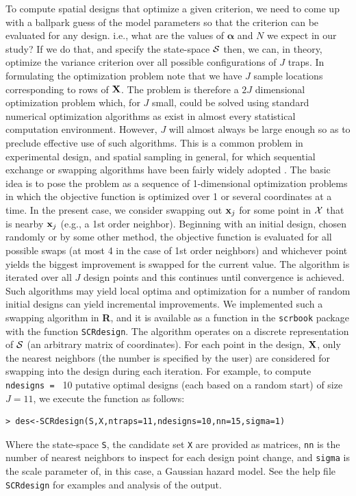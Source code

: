 To compute spatial designs that optimize a given criterion, we need to
come up with a ballpark guess of the model parameters so that the
criterion can be evaluated for any design. i.e., what are the values of
${\bm \alpha}$ and $N$ we expect in our study?  If we do that, and
specify the state-space ${\cal S}$ then, we can, in theory, optimize
the variance criterion over all possible configurations of $J$ traps.
In formulating the optimization problem note that we have $J$ sample
locations corresponding to rows of ${\bf X}$.  The problem is
therefore a $2J$ dimensional optimization problem which, for $J$
small, could be solved using standard numerical optimization
algorithms as exist in almost every statistical computation
environment.  However, $J$ will almost always be large enough so as to
preclude effective use of such algorithms. This is a common problem in
experimental design, and spatial sampling in general, for which
sequential exchange or swapping algorithms have been fairly widely
adopted \citep[e.g.,][]{wynn:1970, fedorov:1972, mitchell:1974,
  meyer_nachtsheim:1995,nychka_etal:1997,royle_nychka:1998}.  The
basic idea is to pose the problem as a sequence of 1-dimensional
optimization problems in which the objective function is optimized
over 1 or several coordinates at a time.  In the present case, we
consider swapping out ${\bf x}_{j}$ for some point in ${\cal X}$ that
is nearby ${\bf x}_{j}$ (e.g., a 1st order neighbor). Beginning with
an initial design, chosen randomly or by some other method, the
objective function is evaluated for all possible swaps (at most 4 in
the case of 1st order neighbors) and whichever point yields the
biggest improvement is swapped for the current value.  The algorithm
is iterated over all $J$ design points and this continues until
convergence is achieved. Such algorithms may yield local optima and
optimization for a number of random initial designs can yield
incremental improvements. We implemented such a swapping algorithm in
{\bf R}, and it is available as a function in the \mbox{\tt scrbook}
package with the function \mbox{\tt SCRdesign}.  The algorithm
operates on a discrete representation of ${\cal S}$ (an arbitrary
matrix of coordinates).  For each point in the design, ${\bf X}$, only
the nearest neighbors (the number is specified by the user) are
considered for swapping into the design during each iteration.  For
example, to compute \mbox{\tt ndesigns = } 10 putative optimal designs
(each based on a random start) of size $J=11$, we execute the function
as follows:
\begin{verbatim}
> des<-SCRdesign(S,X,ntraps=11,ndesigns=10,nn=15,sigma=1)
\end{verbatim}
Where the state-space \mbox{\tt S}, the candidate set \mbox{\tt X} are
provided as matrices, \mbox{\tt nn} is the number of nearest neighbors
to inspect for each design point change, and \mbox{\tt sigma} is the scale
parameter of, in this case, a Gaussian hazard model. See the help file
\mbox{\tt SCRdesign} for examples and analysis of the output. 


